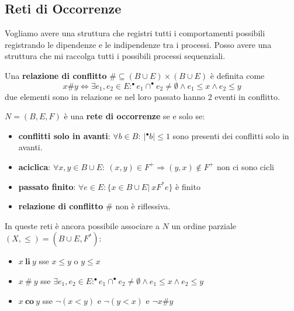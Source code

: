 \subsection{Reti di Occorrenze}
Vogliamo avere una struttura che registri tutti i comportamenti possibili
registrando le dipendenze e le indipendenze tra i processi. Posso avere una
struttura che mi raccolga tutti i possibili processi sequenziali.
\begin{definizione}
    Una \textbf{relazione di conflitto}  $\#\subseteq (B\cup E)\times (B\cup E)$
    è definita come
    \begin{equation}
        x\#y\iff \exists e_1,e_2\in E :^{\bullet}e_1 \cap ^{\bullet} e_2\ne \emptyset
        \land e_1\le x \land e_2\le y
    \end{equation}
    due elementi sono in relazione se nel loro passato hanno 2 eventi in conflitto.
\end{definizione}
\begin{definizione}
    $N = (B, E, F)$ è una \textbf{rete di occorrenze} se e solo se:
    \begin{itemize}
        \item \textbf{conflitti solo in avanti}: $\forall b \in B: \ | ^{\bullet}b|
                  \leq 1$ sono presenti dei conflitti solo in avanti.
        \item \textbf{aciclica}: $\forall x, y \in B \cup E: \ (x, y) \in F^{+}
                  \Rightarrow (y, x) \notin F^{+}$
              non ci sono cicli
        \item\textbf{passato finito}: $\forall e \in E: \{x \in B \cup E| \
                  xF^{\ast} e \}$ è finito
        \item \textbf{relazione di conflitto} $\#$ non è riflessiva.
    \end{itemize}
\end{definizione}
In queste reti è ancora possibile associare a $N$ un ordine parziale
$(X, \leq) = (B \cup E, F^{\ast})$:
\begin{itemize}
    \item $x \ \textbf{li} \ y$ sse $x\le y$ o $y\le x$
    \item $x \ \# \ y$ sse $\exists e_1,e_2\in E :^{\bullet}e_1 \cap ^{\bullet} e_2\ne \emptyset
    \land e_1\le x \land e_2\le y$
    \item $x \ \textbf{co} \ y$ sse $\lnot (x<y)$ e $\lnot (y<x)$ e $\lnot x\#y$
\end{itemize}

